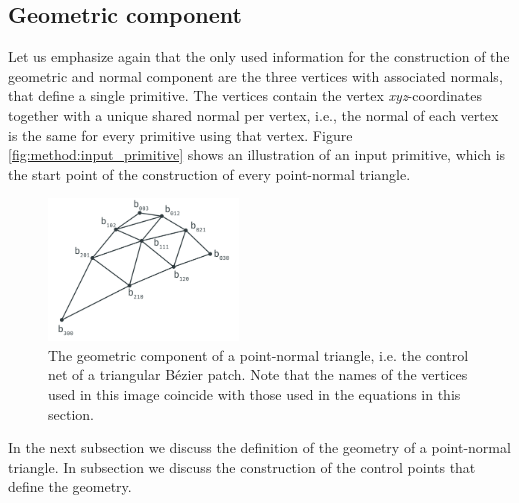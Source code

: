 
\subsection{Geometric component}
\label{ss:geometric_component}
Let us emphasize again that the only used information for the construction of the geometric and normal component are the three vertices with associated normals, that define a single primitive. The vertices contain the vertex \textit{xyz}-coordinates together with a unique shared normal per vertex, i.e., the normal of each vertex is the same for every primitive using that vertex. Figure \ref{fig:method:input_primitive} shows an illustration of an input primitive, which is the start point of the construction of every point-normal triangle.

\begin{figure}
	\centering
	\includegraphics[width=0.45\textwidth]{./content/img/method/geometry.png}
	\caption{The geometric component of a point-normal triangle, i.e. the control net of a triangular Bézier patch. Note that the names of the vertices used in this image coincide with those used in the equations in this section.}
	\label{fig:method:control_net}
\end{figure}
%
%
In the next subsection we discuss the definition of the geometry of a point-normal triangle. In subsection  we discuss the construction of the control points that define the geometry. 

